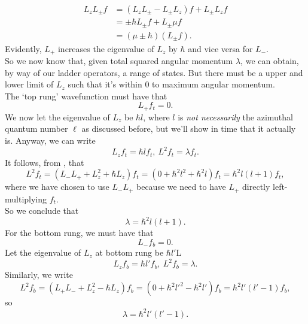 \begin{equation}
\begin{aligned}
L_zL_{\pm}f&=(L_zL_{\pm}-L_{\pm}L_z)f+L_{\pm}L_zf\\
&=\pm\hbar L_{\pm}f+L_{\pm}\mu f\\
&=(\mu\pm\hbar)(L_{\pm}f). 
\end{aligned}
\end{equation}
Evidently, $L_{+}$ increases the eigenvalue of $L_z$ by $\hbar$ and 
vice versa for $L_{-}$. \\
So we now know that, given total squared angular momentum $\lambda$, we can 
obtain, by way of our ladder operators, a range of states. 
But there must be a upper and lower limit of $L_z$ such that it's 
within $0$ to maximum angular momentum. \\
The `top rung' wavefunction must have that
\begin{equation}
L_+f_t=0.
\end{equation}
We now let the eigenvalue of $L_z$ be $\hbar l$, where $l$ is 
\textit{not necessarily} the azimuthal quantum number $\ell$ as discussed before, 
but we'll show in time that it actually is. Anyway, we can write
\begin{equation}
L_zf_t=\hbar lf_t,\ L^2f_t=\lambda f_t.
\end{equation}
It follows, from , that
\begin{equation}
L^2f_t=(L_-L_++L^2_z+\hbar L_z)f_t=(0+\hbar^2l^2+\hbar^2l)f_t=\hbar^2 l(l+1)f_t, 
\end{equation}
where we have chosen to use $L_-L_+$ 
because we need to have $L_+$ directly left-multiplying $f_t$. \\
So we conclude that
\begin{equation}
\lambda=\hbar^2 l(l+1).
\end{equation}
For the bottom rung, we must have that
\begin{equation}
L_-f_b=0.
\end{equation}
Let the eigenvalue of $L_z$ at bottom rung be $\hbar l'$L
\begin{equation}
L_zf_b=\hbar l'f_b,\ L^2f_b=\lambda.
\end{equation}
Similarly, we write
\begin{equation}
L^2f_b=(L_+L_-+L^2_z-\hbar L_z)f_b=(0+\hbar^2l'^2-\hbar^2l')f_b=\hbar^2l'(l'-1)f_b, 
\end{equation}
so
\begin{equation}
\lambda=\hbar^2l'(l'-1).
\end{equation}
